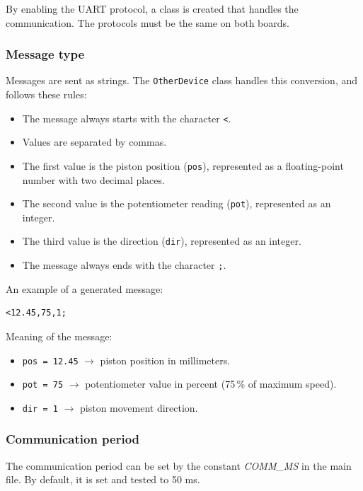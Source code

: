 By enabling the UART protocol, a class is created that handles the communication.  
The protocols must be the same on both boards.

\subsubsection{Message type}
Messages are sent as strings. The \texttt{OtherDevice} class handles this conversion,  
and follows these rules:

\begin{itemize}
    \item The message always starts with the character \texttt{<}.
    \item Values are separated by commas.
    \item The first value is the piston position (\texttt{pos}), represented as a floating-point number with two decimal places.
    \item The second value is the potentiometer reading (\texttt{pot}), represented as an integer.
    \item The third value is the direction (\texttt{dir}), represented as an integer.
    \item The message always ends with the character \texttt{;}.
\end{itemize}

\noindent
An example of a generated message:
\begin{verbatim}
<12.45,75,1;
\end{verbatim}

\noindent
Meaning of the message:
\begin{itemize}
    \item \texttt{pos = 12.45} $\rightarrow$ piston position in millimeters.
    \item \texttt{pot = 75} $\rightarrow$ potentiometer value in percent (75\,\% of maximum speed).
    \item \texttt{dir = 1} $\rightarrow$ piston movement direction.
\end{itemize}

\subsubsection{Communication period}
The communication period can be set by the constant \textit{COMM\_MS} in the main file. By default, it is set and tested to 50 ms.

